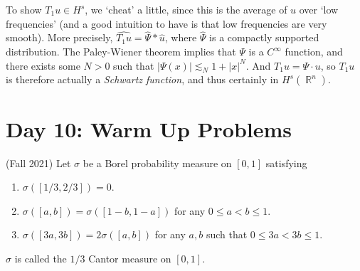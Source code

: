 \documentclass[answers]{exam}
\DeclareMathOperator{\RR}{\mathbb{R}}
\theoremstyle{problemstyle}
\newcommand{\1}[1]{\textbf{1}_{\left[#1\right]}} %
\begin{document}
\begin{questions}
\begin{solution}
    To show $T_1 u \in H^s$, we `cheat' a little, since this is the average of $u$ over `low frequencies' (and a good intuition to have is that low frequencies are very smooth). More precisely, $\widehat{T_1 u} = \widehat{\Psi} * \widehat{u}$, where $\widehat{\Psi}$ is a compactly supported distribution. The Paley-Wiener theorem implies that $\Psi$ is a $C^\infty$ function, and there exists some $N > 0$ such that $|\Psi(x)| \lesssim_N 1 + |x|^N$. And $T_1 u = \Psi \cdot u$, so $T_1 u$ is therefore actually a \emph{Schwartz function}, and thus certainly in $H^s(\RR^n)$.
\end{solution}





\newpage
\section*{Day 10: Warm Up Problems}

\question (Fall 2021) Let $\sigma$ be a Borel probability measure on $[0,1]$ satisfying
%
\begin{enumerate}
	\item $\sigma([1/3,2/3]) = 0$.
	\item $\sigma([a,b]) = \sigma([1-b,1-a])$ for any $0 \leq a < b \leq 1$.
	\item $\sigma([3a,3b]) = 2 \sigma([a,b])$ for any $a,b$ such that $0 \leq 3a < 3b \leq 1$.
\end{enumerate}
%
$\sigma$ is called the $1/3$ Cantor measure on $[0,1]$.
\end{questions}
\end{document}
